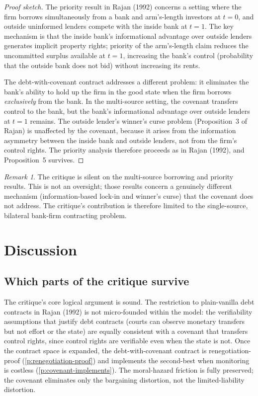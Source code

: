 \documentclass[12pt,a4paper]{article}
\theoremstyle{plain}
\theoremstyle{definition}
\theoremstyle{remark}
\newtheorem{remark}[theorem]{Remark}
\begin{document}
\begin{proof}[Proof sketch]
The priority result in Rajan (1992) concerns a setting where the firm borrows simultaneously from a bank and arm's-length investors at $t = 0$, and outside uninformed lenders compete with the inside bank at $t = 1$. The key mechanism is that the inside bank's informational advantage over outside lenders generates implicit property rights; priority of the arm's-length claim reduces the uncommitted surplus available at $t = 1$, increasing the bank's control (probability that the outside bank does not bid) without increasing its rents.

The debt-with-covenant contract addresses a different problem: it eliminates the bank's ability to hold up the firm in the good state when the firm borrows \emph{exclusively} from the bank. In the multi-source setting, the covenant transfers control to the bank, but the bank's informational advantage over outside lenders at $t = 1$ remains. The outside lender's winner's curse problem (Proposition~3 of Rajan) is unaffected by the covenant, because it arises from the information asymmetry between the inside bank and outside lenders, not from the firm's control rights. The priority analysis therefore proceeds as in Rajan (1992), and Proposition~5 survives.
\end{proof}

\begin{remark}
\label{r:priority}
The critique is silent on the multi-source borrowing and priority results. This is not an oversight; those results concern a genuinely different mechanism (information-based lock-in and winner's curse) that the covenant does not address. The critique's contribution is therefore limited to the single-source, bilateral bank-firm contracting problem.
\end{remark}

\section{Discussion}
\label{sec:discussion}

\subsection{Which parts of the critique survive}

The critique's core logical argument is sound. The restriction to plain-vanilla debt contracts in Rajan (1992) is not micro-founded within the model: the verifiability assumptions that justify debt contracts (courts can observe monetary transfers but not effort or the state) are equally consistent with a covenant that transfers control rights, since control rights are verifiable even when the state is not. Once the contract space is expanded, the debt-with-covenant contract is renegotiation-proof (\cref{p:renegotiation-proof}) and implements the second-best when monitoring is costless (\cref{p:covenant-implements}). The moral-hazard friction is fully preserved; the covenant eliminates only the bargaining distortion, not the limited-liability distortion.
\end{document}
